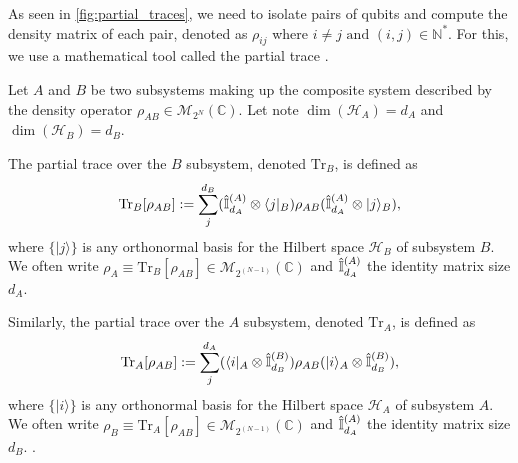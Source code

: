As seen in \ref{fig:partial_traces}, we need to isolate 
pairs of qubits and compute the density matrix of each pair, denoted as 
\( \rho_{ij} \) where \( i \neq j \text{ and } (i,j) \in \mathbb{N}^* \). 
For this, we use a mathematical tool called the partial trace \cite{bradley_at_2020}.



Let $A$ and $B$ be two subsystems making up the composite system described by the density operator 
$\rho_{AB} \in \mathcal{M}_{2^N}(\mathbb{C})$.
Let note $\dim(\mathcal{H}_A) = d_A$ and $\dim(\mathcal{H}_B) = d_B$.

The partial trace over the $B$ subsystem, denoted $\text{Tr}_B$, is defined as
\begin{equation}\label{eq: partial trace}
\text{Tr}_B[\rho_{AB}] := \sum_j^{d_B} (\hat{\mathbb{I}}_{d_A}^{(A)} \otimes \langle j|_B) \rho_{AB} (\hat{\mathbb{I}}_{d_A}^{(A)} \otimes |j\rangle_B), 
\end{equation}
where $\{|j\rangle\}$ is any orthonormal basis for the Hilbert space $\mathcal{H}_B$ of subsystem $B$. 
We often write $\rho_A \equiv \text{Tr}_B[\rho_{AB}] \in \mathcal{M}_{2^{(N-1)}}(\mathbb{C})$ and $\hat{\mathbb{I}}_{d_A}^{(A)}$ the identity
matrix size $d_A$. 




Similarly, the partial trace over the $A$ subsystem, denoted $\text{Tr}_A$, is defined as
\begin{equation}
\text{Tr}_A[\rho_{AB}] := \sum_j^{d_A} (\langle i|_A \otimes \hat{\mathbb{I}}_{d_B}^{(B)}) \rho_{AB} (|i\rangle_A \otimes \hat{\mathbb{I}}_{d_B}^{(B)}), 
\end{equation}
where $\{|i\rangle\}$ is any orthonormal basis for the Hilbert space $\mathcal{H}_A$ of subsystem $A$. 
We often write $\rho_B \equiv \text{Tr}_A[\rho_{AB}] \in \mathcal{M}_{2^{(N-1)}}(\mathbb{C})$ and $\hat{\mathbb{I}}_{d_A}^{(A)}$ the identity
matrix size $d_B$. 
 .







